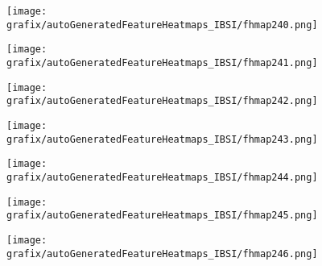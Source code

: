 \hspace{\hsp} 
\begin{subfigure}{\wid\textwidth} 
    \centering 
    \caption{\tiny \sffamily {}} 
    \vspace{\vsp} 
    \texttt{[image: grafix/autoGeneratedFeatureHeatmaps\_IBSI/fhmap240.png]} 
\end{subfigure} 
\hspace{\hsp} 
\begin{subfigure}{\wid\textwidth} 
    \centering 
    \caption{\tiny \sffamily {}} 
    \vspace{\vsp} 
    \texttt{[image: grafix/autoGeneratedFeatureHeatmaps\_IBSI/fhmap241.png]} 
\end{subfigure} 
\hspace{\hsp} 
\begin{subfigure}{\wid\textwidth} 
    \centering 
    \caption{\tiny \sffamily {}} 
    \vspace{\vsp} 
    \texttt{[image: grafix/autoGeneratedFeatureHeatmaps\_IBSI/fhmap242.png]} 
\end{subfigure} 
\hspace{\hsp} 
\begin{subfigure}{\wid\textwidth} 
    \centering 
    \caption{\tiny \sffamily {}} 
    \vspace{\vsp} 
    \texttt{[image: grafix/autoGeneratedFeatureHeatmaps\_IBSI/fhmap243.png]} 
\end{subfigure} 
\hspace{\hsp} 
\begin{subfigure}{\wid\textwidth} 
    \centering 
    \caption{\tiny \sffamily {}} 
    \vspace{\vsp} 
    \texttt{[image: grafix/autoGeneratedFeatureHeatmaps\_IBSI/fhmap244.png]} 
\end{subfigure} 
\hspace{\hsp} 
\begin{subfigure}{\wid\textwidth} 
    \centering 
    \caption{\tiny \sffamily {}} 
    \vspace{\vsp} 
    \texttt{[image: grafix/autoGeneratedFeatureHeatmaps\_IBSI/fhmap245.png]} 
\end{subfigure} 
\hspace{\hsp} 
\begin{subfigure}{\wid\textwidth} 
    \centering 
    \caption{\tiny \sffamily {}} 
    \vspace{\vsp} 
    \texttt{[image: grafix/autoGeneratedFeatureHeatmaps\_IBSI/fhmap246.png]} 
\end{subfigure} 
